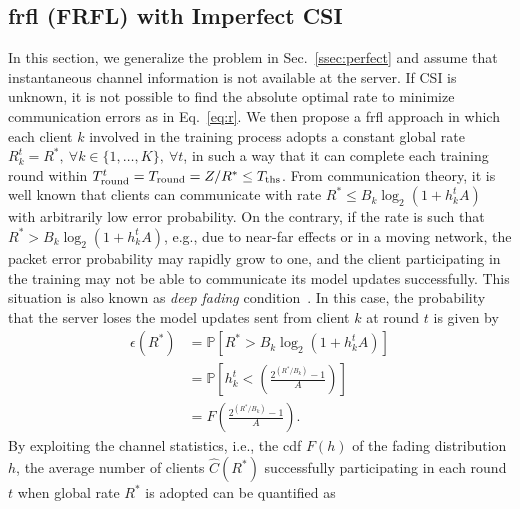\documentclass[10pt, conference, letterpaper]{IEEEtran}
\begin{document}
	\subsection{\Acrlong{frfl} (FRFL) with Imperfect CSI} %
	\label{ssec:imperfect}
	In this section, we generalize the problem in Sec.~\ref{ssec:perfect} and assume that instantaneous channel information is not available at the server.
	If CSI is unknown, it is not possible to find the absolute optimal rate to minimize communication errors as in Eq.~\eqref{eq:r}. 
	We then propose a \gls{frfl} approach in which each client $k$ involved in the training process adopts a constant global rate ${R_k^t=R^*, \:\forall k \in \{1, \dots, K\}, \:\forall t}$, in such a way that it can complete each training round within ${T_{\rm round}^t  = T_{\rm round} = Z/R^* \leq T_{\rm ths}}$.
	From communication theory, it is well known that clients can communicate with rate $R^* \leq B_k \log_2(1 + h_k^t A )$ with arbitrarily low error probability.
	On the contrary, if the rate is such that ${R^* > B_k \log_2(1 + h_k^t A)}$, e.g., due to near-far effects or in a moving network, the packet error probability may rapidly grow to one, and the client participating in the training may not be able to communicate its model updates successfully.  This situation is also known as \emph{deep fading} condition~\cite{Angjelichinoski2019}. 
	In this case, the probability that the server loses the model updates sent from client $k$ at round $t$ is given by
	\begin{equation}
		\begin{split}
			\epsilon(R^*) & = \mathbb{P}[R^* > B_k \log_2(1 + h_k^t A)] \\[5pt]
			&= \mathbb{P}\left[ h_k^t < \left(\frac{2^{(R^*/B_k)} -1}{A}\right)\right] \\[5pt]
			&= F\left(\frac{2^{(R^* / B_k)} -1}{A}\right).
		\end{split}
	\end{equation}
	By exploiting the channel statistics, i.e., the \gls{cdf} $F(h)$ of the fading distribution $h$, the average number of clients $\hat{C}(R^*)$ successfully participating in each round $t$ when global rate $R^*$ is adopted can be quantified as
\end{document}
